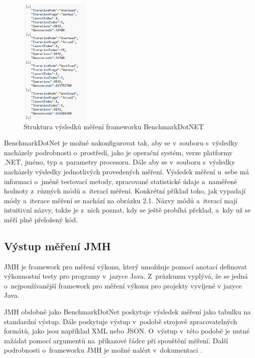 \begin{figure}[!ht]
    \centering
    \includegraphics[width=0.3\textwidth]{../img/BenchmarkDotNET-modes.png}
    \caption{Struktura výsledků měření frameworku BenchmarkDotNET}
\end{figure}

BenchmarkDotNet je možné nakonfigurovat tak, aby se v~souboru s~výsledky nacházely podrobnosti o~prostředí, jako je operační systém,
verze platformy .NET, jméno, typ a~parametry procesoru. Dále aby se v~souboru s~výsledky nacházely
výsledky jednotlivých provedených měření. Výsledek měření u~sebe má informaci o~jméně
testovací metody, zpracované statistické údaje a~naměřené hodnoty z~různých módů a~iterací měření.
Konkrétní příklad toho, jak vypadají módy a~iterace měření se nachází na obrázku 2.1.
Názvy módů a~iterací mají intuitivní názvy, takže je z~nich poznat, kdy se ještě probíhá
překlad, a~kdy už se měří plně přeložený kód.

\subsection{Výstup měření JMH}

JMH je framework pro měření výkonu, který umožňuje pomocí anotací definovat výkonnostní testy
pro programy v~jazyce Java. Z~průzkumu \cite[]{unitTestingPerformanceSurvey} vyplývá, že se jedná o~nejpoužívanější framework
pro měření výkonu pro projekty vyvíjené v jazyce Java.

JMH obdobně jako BenchmarkDotNet poskytuje výsledek měření jako tabulku na standardní výstup.
Dále poskytuje výstup v~podobě strojově zpracovatelných formátů, jako jsou například XML
nebo JSON. O~výstup v~této podobě je nutné zažádat pomocí argumentů na~příkazové řádce při
spouštění měření. Další podrobnosti o~frameworku JMH je možné nalézt v~dokumentaci \cite[]{jmh}.

